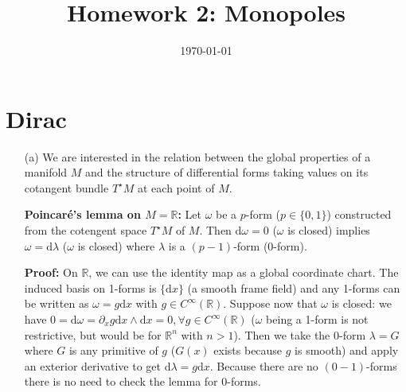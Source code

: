 \documentclass[10pt, a4paper]{article}
\title{Homework 2: Monopoles} %
\author{\PA} %
\date{\today} %
\begin{document}
\maketitlepage

\maketableofcontents


\footnotesize{

\section{Dirac}

\begin{enumerate}

  \item[(a)] We are interested in the relation between the global properties of a manifold $M$ and the structure of differential forms taking values on its cotangent bundle $T^\star M$ at each point of $M$.

  \textbf{Poincaré's lemma on $M = \mathbb{R}$:} Let $\omega$ be a $p$-form ($p \in \{0, 1\}$) constructed from the cotengent space $T^\star M$ of $M$. Then $\text{d}\omega = 0$ ($\omega$ is closed) implies $\omega = \text{d}\lambda$ ($\omega$ is closed) where $\lambda$ is a $(p-1)$-form ($0$-form).

  \textbf{Proof:} On $\mathbb{R}$, we can use the identity map as a global coordinate chart. The induced basis on 1-forms is $\{\text{d}x\}$ (a smooth frame field) and any 1-forms can be written as $\omega = g \text{d}x$ with $ g \in C^{\infty}(\mathbb{R})$. Suppose now that $\omega$ is closed: we have $0 = \text{d}\omega = \partial_x g \text{d}x \wedge \text{d}x = 0, \forall g \in C^{\infty}(\mathbb{R})$ ($\omega$ being a 1-form is not restrictive, but would be for $\mathbb{R}^n$ with $n>1$). Then we take the $0$-form $\lambda = G$ where $G$ is any primitive of $g$ ($G(x)$ exists because $g$ is smooth) and apply an exterior derivative to get $\text{d}\lambda = g \text{d}x$. Because there are no $(0-1)$-forms there is no need to check the lemma for $0$-forms. 


\end{enumerate}}
\end{document}

